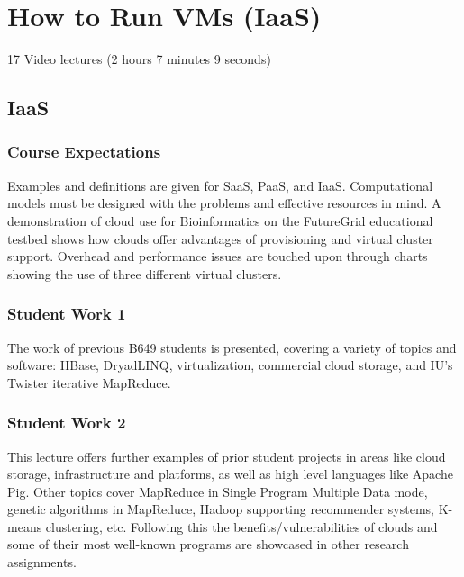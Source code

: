 \part{How to Run VMs (IaaS)}
\label{sec:icloud-iaas}

  17 Video lectures (2 hours 7 minutes 9 seconds)

\chapter{IaaS}

\section{Course Expectations}

Examples and definitions are given for SaaS, PaaS, and IaaS.
Computational models must be designed with the problems and effective
resources in mind. A demonstration of cloud use for Bioinformatics on
the FutureGrid educational testbed shows how clouds offer advantages of
provisioning and virtual cluster support. Overhead and performance
issues are touched upon through charts showing the use of three
different virtual clusters.



\section{Student Work 1}

The work of previous B649 students is presented, covering a variety of
topics and software: HBase, DryadLINQ, virtualization, commercial cloud
storage, and IU's Twister iterative MapReduce.



\section{Student Work 2}

This lecture offers further examples of prior student projects in areas
like cloud storage, infrastructure and platforms, as well as high level
languages like Apache Pig. Other topics cover MapReduce in Single
Program Multiple Data mode, genetic algorithms in MapReduce, Hadoop
supporting recommender systems, K-means clustering, etc. Following this
the benefits/vulnerabilities of clouds and some of their most well-known
programs are showcased in other research assignments.

